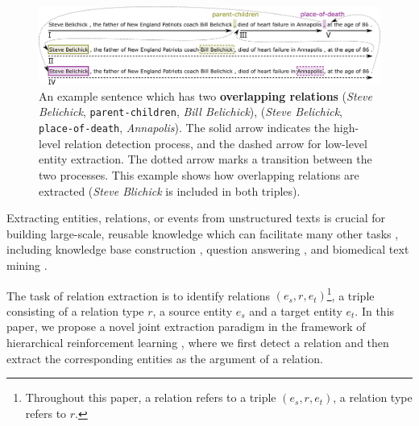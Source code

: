 \documentclass[letterpaper]{article} %
\theoremstyle{definition}
\begin{document}
\begin{figure}[!tp]
    \centering
    \includegraphics[width=\linewidth]{example.png}
    \caption{An example sentence which has two {\bf overlapping relations} (\textit{Steve Belichick}, \texttt{parent-children}, \textit{Bill Belichick}), (\textit{Steve Belichick}, \texttt{place-of-death}, \textit{Annapolis}). The solid arrow indicates the high-level relation detection process, and the dashed arrow for low-level entity extraction. The dotted arrow marks a transition between the two processes. This example shows how overlapping relations are extracted (\textit{Steve Blichick} is included in both triples).}
    \label{Example}
\end{figure}

Extracting entities, relations, or events from unstructured texts is crucial for building large-scale, reusable knowledge which can facilitate many other tasks \cite{mintz2009distant,nadeau2007survey}, including knowledge base construction \cite{dong2014knowledge,luan2018multi}, question answering \cite{fader2014open}, and biomedical text mining \cite{huang2015community}. 

%  

The task of relation extraction is to identify relations $(e_s, r, e_t)$\footnote{Throughout this paper, a relation refers to a triple $(e_s, r, e_t)$, a relation type refers to $r$.}, a triple consisting of a relation type $r$, a source entity $e_s$ and a target entity $e_t$. In this paper, we propose a novel joint extraction paradigm in the framework of hierarchical reinforcement learning \cite{sutton1999between}, where we first detect a relation and then extract the corresponding entities as the argument of a relation. 
\end{document}
